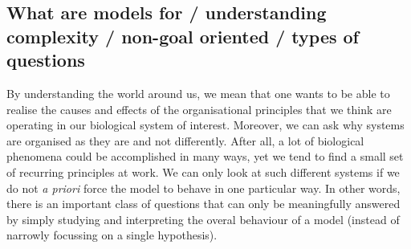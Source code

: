 \subsection{What are models for / understanding complexity / non-goal oriented / types of questions}

By understanding the world around us, we mean that one wants to be able to realise the causes and effects of the organisational principles that we think are operating in our biological system of interest. Moreover, we can ask why systems are organised as they are and not differently. After all, a lot of biological phenomena could be accomplished in many ways, yet we tend to find a small set of recurring principles at work. We can only look at such different systems if we do not \emph{a priori} force the model to behave in one particular way. In other words, there is an important class of questions that can only be meaningfully answered by simply studying and interpreting the overal behaviour of a model (instead of narrowly focussing on a single hypothesis).
  
  